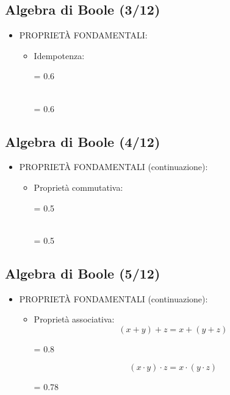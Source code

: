 \documentclass[10pt,a4paper,twoside,twocolumn]{article}
\begin{document}
\subsection{Algebra di Boole (3/12)}
\begin{itemize}
\item
PROPRIET\`A FONDAMENTALI:
\begin{itemize}
\item
Idempotenza:

\epsfxsize = 0.6 \columnwidth
{}

~ \\

\epsfxsize = 0.6 \columnwidth
{}
\end{itemize}
\end{itemize}



\subsection{Algebra di Boole (4/12)}
\begin{itemize}
\item
PROPRIET\`A FONDAMENTALI (continuazione):
\begin{itemize}
\item
Propriet\`a commutativa:

\epsfxsize = 0.5 \columnwidth
{}

~ \\

\epsfxsize = 0.5 \columnwidth
{}
\end{itemize}
\end{itemize}



\subsection{Algebra di Boole (5/12)}
\begin{itemize}
\item
PROPRIET\`A FONDAMENTALI (continuazione):
\begin{itemize}
\item
Propriet\`a associativa:
\[(x + y) + z = x + (y + z)\]
\begin{center}
\epsfxsize = 0.8 \columnwidth
{}
\end{center}
\vspace{3mm}
\[ (x \cdot y) \cdot z = x \cdot (y \cdot z)\]
\begin{center}
\epsfxsize = 0.78 \columnwidth
{}
\end{center}
\end{itemize}
\end{itemize}
\end{document}
